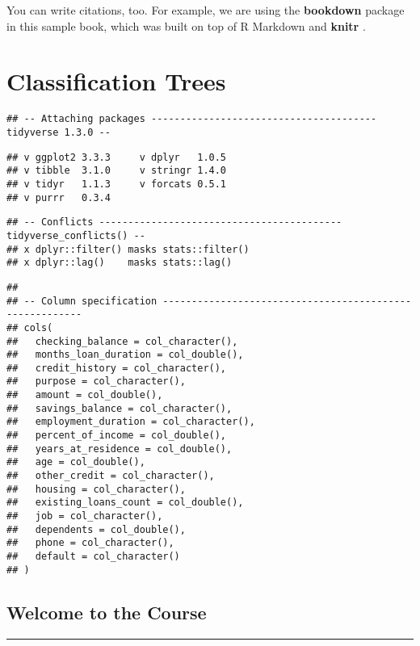 \documentclass[
]{book}
\begin{document}
You can write citations, too. For example, we are using the \textbf{bookdown} package \citep{R-bookdown} in this sample book, which was built on top of R Markdown and \textbf{knitr} \citep{xie2015}.

\hypertarget{classification-trees}{%
\chapter{Classification Trees}\label{classification-trees}}

\begin{verbatim}
## -- Attaching packages --------------------------------------- tidyverse 1.3.0 --
\end{verbatim}

\begin{verbatim}
## v ggplot2 3.3.3     v dplyr   1.0.5
## v tibble  3.1.0     v stringr 1.4.0
## v tidyr   1.1.3     v forcats 0.5.1
## v purrr   0.3.4
\end{verbatim}

\begin{verbatim}
## -- Conflicts ------------------------------------------ tidyverse_conflicts() --
## x dplyr::filter() masks stats::filter()
## x dplyr::lag()    masks stats::lag()
\end{verbatim}

\begin{verbatim}
## 
## -- Column specification --------------------------------------------------------
## cols(
##   checking_balance = col_character(),
##   months_loan_duration = col_double(),
##   credit_history = col_character(),
##   purpose = col_character(),
##   amount = col_double(),
##   savings_balance = col_character(),
##   employment_duration = col_character(),
##   percent_of_income = col_double(),
##   years_at_residence = col_double(),
##   age = col_double(),
##   other_credit = col_character(),
##   housing = col_character(),
##   existing_loans_count = col_double(),
##   job = col_character(),
##   dependents = col_double(),
##   phone = col_character(),
##   default = col_character()
## )
\end{verbatim}

\hypertarget{welcome-to-the-course}{%
\section*{Welcome to the Course}\label{welcome-to-the-course}}

\begin{center}\rule{0.5\linewidth}{0.5pt}\end{center}
\end{document}
